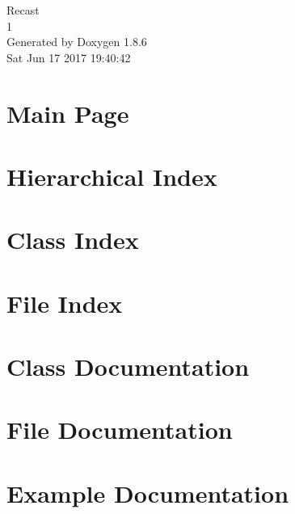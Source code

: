 \documentclass[twoside]{book}
\newcommand{\clearemptydoublepage}{%
  \newpage{\pagestyle{empty}\cleardoublepage}%
}
\begin{document}
\hypersetup{pageanchor=false}
\begin{titlepage}
\vspace*{7cm}
\begin{center}%
{\Large Recast \\[1ex]\large 1 }\\
\vspace*{1cm}
{\large Generated by Doxygen 1.8.6}\\
\vspace*{0.5cm}
{\small Sat Jun 17 2017 19:40:42}\\
\end{center}
\end{titlepage}
\clearemptydoublepage
\tableofcontents
\clearemptydoublepage
{}
\hypersetup{pageanchor=true}

\chapter{Main Page}
\label{index}\hypertarget{index}{}
\chapter{Hierarchical Index}

\chapter{Class Index}

\chapter{File Index}

\chapter{Class Documentation}














\chapter{File Documentation}



























\chapter{Example Documentation}



\newpage
{}
{}
\printindex
\end{document}
